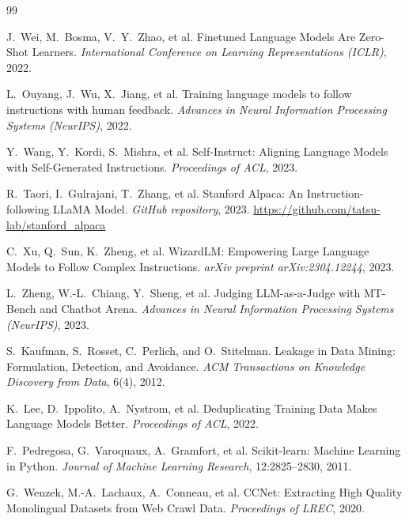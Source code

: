 \documentclass[11pt]{article}
\begin{document}
\begin{thebibliography}{99}

J.~Wei, M.~Bosma, V.~Y.~Zhao, et al.
\newblock Finetuned Language Models Are Zero-Shot Learners.
\newblock \emph{International Conference on Learning Representations (ICLR)}, 2022.

L.~Ouyang, J.~Wu, X.~Jiang, et al.
\newblock Training language models to follow instructions with human feedback.
\newblock \emph{Advances in Neural Information Processing Systems (NeurIPS)}, 2022.

Y.~Wang, Y.~Kordi, S.~Mishra, et al.
\newblock Self-Instruct: Aligning Language Models with Self-Generated Instructions.
\newblock \emph{Proceedings of ACL}, 2023.

R.~Taori, I.~Gulrajani, T.~Zhang, et al.
\newblock Stanford Alpaca: An Instruction-following LLaMA Model.
\newblock \emph{GitHub repository}, 2023.
\newblock \url{https://github.com/tatsu-lab/stanford_alpaca}

C.~Xu, Q.~Sun, K.~Zheng, et al.
\newblock WizardLM: Empowering Large Language Models to Follow Complex Instructions.
\newblock \emph{arXiv preprint arXiv:2304.12244}, 2023.

L.~Zheng, W.-L.~Chiang, Y.~Sheng, et al.
\newblock Judging LLM-as-a-Judge with MT-Bench and Chatbot Arena.
\newblock \emph{Advances in Neural Information Processing Systems (NeurIPS)}, 2023.

S.~Kaufman, S.~Rosset, C.~Perlich, and O.~Stitelman.
\newblock Leakage in Data Mining: Formulation, Detection, and Avoidance.
\newblock \emph{ACM Transactions on Knowledge Discovery from Data}, 6(4), 2012.

K.~Lee, D.~Ippolito, A.~Nystrom, et al.
\newblock Deduplicating Training Data Makes Language Models Better.
\newblock \emph{Proceedings of ACL}, 2022.

F.~Pedregosa, G.~Varoquaux, A.~Gramfort, et al.
\newblock Scikit-learn: Machine Learning in Python.
\newblock \emph{Journal of Machine Learning Research}, 12:2825--2830, 2011.

G.~Wenzek, M.-A.~Lachaux, A.~Conneau, et al.
\newblock CCNet: Extracting High Quality Monolingual Datasets from Web Crawl Data.
\newblock \emph{Proceedings of LREC}, 2020.


\end{thebibliography}
\end{document}
